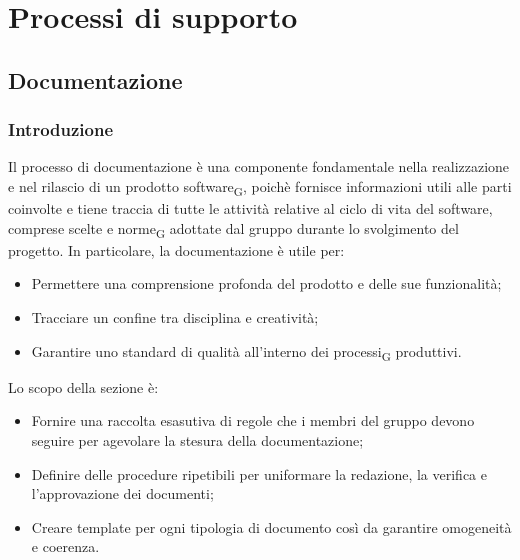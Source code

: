 \section{Processi di supporto}

\subsection{Documentazione}
\subsubsection{Introduzione}
Il processo di documentazione è una componente fondamentale nella realizzazione e nel rilascio di un prodotto {software\textsubscript{G}},
poichè fornisce informazioni utili alle parti coinvolte e tiene traccia di tutte le attività relative al ciclo di vita del software,
comprese scelte e {norme\textsubscript{G}} adottate dal gruppo durante lo svolgimento del progetto. In particolare, la documentazione è utile per:
\begin{itemize}
    \item Permettere una comprensione profonda del prodotto e delle sue funzionalità;
    \item Tracciare un confine tra disciplina e creatività;
    \item Garantire uno standard di qualità all'interno dei {processi\textsubscript{G}} produttivi.
\end{itemize} 
Lo scopo della sezione è:
\begin{itemize}
    \item Fornire una raccolta esasutiva di regole che i membri del gruppo devono seguire per agevolare la stesura della documentazione;
    \item Definire delle procedure ripetibili per uniformare la redazione, la verifica e l'approvazione dei documenti;
    \item Creare template per ogni tipologia di documento così da garantire omogeneità e coerenza.
\end{itemize}

